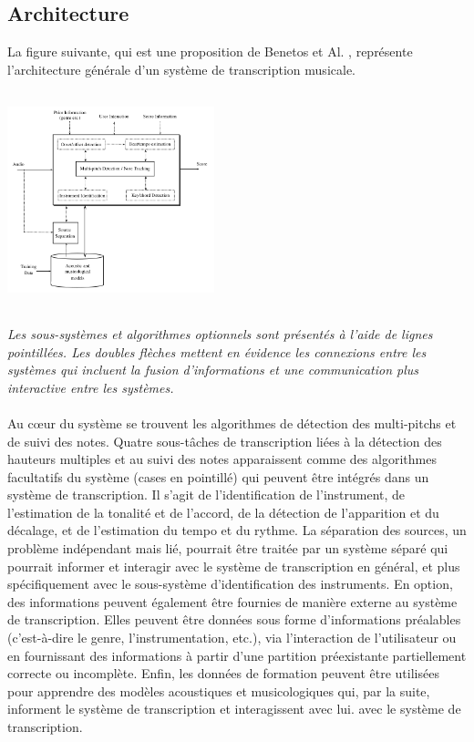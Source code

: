 \subsection*{Architecture}
La figure suivante, qui est une proposition de Benetos et Al. \cite{article1}, représente l'architecture générale d'un système de transcription musicale.\\\\
\includegraphics[height=60mm, width=60mm]{z_images/1_automatic_transcription/0_general_process.png}\\\\
\textit{Les sous-systèmes et algorithmes optionnels sont présentés à l'aide de lignes pointillées. Les doubles flèches mettent en évidence les connexions entre les systèmes qui incluent la fusion d'informations et une communication plus interactive entre les systèmes.}\\\\
Au cœur du système se trouvent les algorithmes de détection des multi-pitchs et de suivi des notes. Quatre sous-tâches de transcription liées à la détection des hauteurs multiples et au suivi des notes apparaissent comme des algorithmes facultatifs du système (cases en pointillé) qui peuvent être intégrés dans un système de transcription. Il s'agit de l'identification de l'instrument, de l'estimation de la tonalité et de l'accord, de la détection de l'apparition et du décalage, et de l'estimation du tempo et du rythme. La séparation des sources, un problème indépendant mais lié, pourrait être traitée par un système séparé qui pourrait informer et interagir avec le système de transcription en général, et plus spécifiquement avec le sous-système d'identification des instruments.
En option, des informations peuvent également être fournies de manière externe au système de transcription. Elles peuvent être données sous forme d'informations préalables (c'est-à-dire le genre, l'instrumentation, etc.), via l'interaction de l'utilisateur ou en fournissant des informations à partir d'une partition préexistante partiellement correcte ou incomplète. Enfin, les données de formation peuvent être utilisées pour apprendre des modèles acoustiques et musicologiques qui, par la suite, informent le système de transcription et interagissent avec lui. avec le système de transcription.
